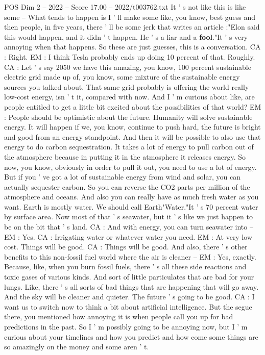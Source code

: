 \begin{textsample}{POS Dim 2 – 2022 – Score 17.00 – 2022/t003762.txt}
It ' s not like this is like some -- What tends to happen is I ' ll make some like, you know, best guess and then people, in five years, there ' ll be some jerk that writes an article :"Elon said this would happen, and it didn ' t happen.
He ' s a liar and a \textbf{fool}."It ' s very annoying when that happens.
So these are just guesses, this is a conversation.
CA : Right.
EM : I think Tesla probably ends up doing 10 percent of that.
Roughly.
CA : Let ' s say 2050 we have this amazing, you know, 100 percent sustainable electric grid made up of, you know, some mixture of the sustainable energy sources you talked about.
That same grid probably is offering the world really low-cost energy, isn ' t it, compared with now.
And I ' m curious about like, are people entitled to get a little bit excited about the possibilities of that world?
EM : People should be optimistic about the future.
Humanity will solve sustainable energy.
It will happen if we, you know, continue to push hard, the future is bright and good from an energy standpoint.
And then it will be possible to also use that energy to do carbon sequestration.
It takes a lot of energy to pull carbon out of the atmosphere because in putting it in the atmosphere it releases energy.
So now, you know, obviously in order to pull it out, you need to use a lot of energy.
But if you ' ve got a lot of sustainable energy from wind and solar, you can actually sequester carbon.
So you can reverse the CO2 parts per million of the atmosphere and oceans.
And also you can really have as much fresh water as you want.
Earth is mostly water.
We should call Earth"Water."It ' s 70 percent water by surface area.
Now most of that ' s seawater, but it ' s like we just happen to be on the bit that ' s land.
CA : And with energy, you can turn seawater into -- EM : Yes.
CA : Irrigating water or whatever water you need.
EM : At very low cost.
Things will be good.
CA : Things will be good.
And also, there ' s other benefits to this non-fossil fuel world where the air is cleaner -- EM : Yes, exactly.
Because, like, when you burn fossil fuels, there ' s all these side reactions and toxic gases of various kinds.
And sort of little particulates that are bad for your lungs.
Like, there ' s all sorts of bad things that are happening that will go away.
And the sky will be cleaner and quieter.
The future ' s going to be good.
CA : I want us to switch now to think a bit about artificial intelligence.
But the segue there, you mentioned how annoying it is when people call you up for bad predictions in the past.
So I ' m possibly going to be annoying now, but I ' m curious about your timelines and how you predict and how come some things are so amazingly on the money and some aren ' t.

\end{textsample}
